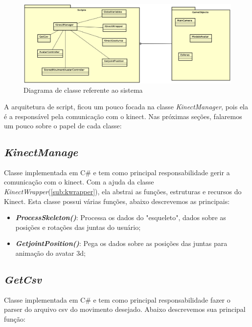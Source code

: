   \begin{figure}[H]
  \centering
  \includegraphics [keepaspectratio=true,scale=0.45]{figuras/DiagramaDeClasse.eps}

  \caption{Diagrama de classe referente ao sistema}
  \label{diagramaClasse}
  \end{figure}

  A arquitetura de script, ficou um pouco focada na classe \textit{KinectManager}, pois ela é a responsável pela comunicação com o kinect.
Nas próximas seções, falaremos um pouco sobre o papel de cada classe:

\subsection{\textit{KinectManage}}\label{sub:kmanager}
  Classe implementada em C\# e tem como principal responsabilidade gerir a comunicação com o kinect. Com a ajuda da classe \textit{KinectWrapper}(\ref{sub:kwrapper}), ela
  abstrai as funções, estruturas e recursos do Kinect. Esta classe possui várias funções, abaixo descrevemos as principais:

  \begin{itemize}
      \item \textit{\textbf{ProcessSkeleton()}}: Processa os dados do "esqueleto", dados sobre as posições e rotações das juntas do usuário;
      \item \textit{\textbf{GetjointPosition()}}: Pega os dados sobre as posições das juntas para animação do avatar 3d;

  \end{itemize}

\subsection{\textit{GetCsv}}\label{sub:getcsv}
  Classe implementada em C\# e tem como principal responsabilidade fazer o parser do arquivo csv do movimento desejado. Abaixo descrevemos sua principal função:

